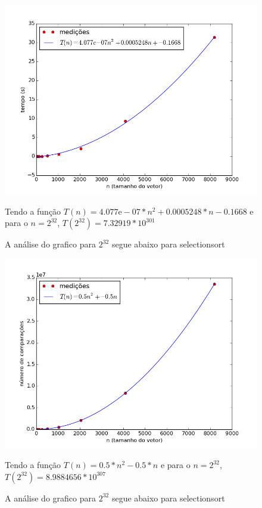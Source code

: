 \documentclass[12pt,a4paper,twoside]{report}
\begin{document}


\begin{figure}[ht]
\centering \includegraphics[scale=0.8]{../selectionsort/imagens/selectionsortQuaseCresc500.png}
\caption{A análise do grafico para $2^{32}$ segue abaixo para selectionsort}

Tendo a função $T(n) = 4.077\mathrm{e}-07*n^{2}+0.0005248*n-0.1668$ e para o $n =2^{32}$, $T(2^{32}) = 7.32919*10^{301}$
\label{fig:selectionsortQuaseCresc500}
\end{figure}

\begin{figure}[ht]
\centering \includegraphics[scale=0.8]{../selectionsort/imagens/selectionsortQuaseCresc501.png}
\caption{A análise do grafico para $2^{32}$ segue abaixo para selectionsort}

Tendo a função $T(n) = 0.5*n^{2}-0.5*n$ e para o $n =2^{32}$, $T(2^{32}) =8.9884656 * 10^{307}$
\label{fig:selectionsortQuaseCresc501}
\end{figure}
\end{document}
